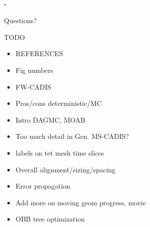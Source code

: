 \documentclass{beamer}
\begin{document}
\begin{frame}[c]
	\frametitle{\tiny{.}}
	\begin{center}
	{\Huge Questions?}
	\end{center}
\end{frame}

\begin{frame}{TODO}
	\begin{itemize}
		\item{REFERENCES}
		\item{Fig numbers}
		\item{FW-CADIS}
		\item{Pros/cons deterministic/MC}
		\item{Intro DAGMC, MOAB}
		\item{Too much detail in Gen. MS-CADIS?}
		\item{labels on tet mesh time slices}
		\item{Overall alignment/sizing/spacing}
		\item{Error propagation}
		\item{Add more on moving geom progress, movie}
		\item{OBB tree optimization}
	\end{itemize}
\end{frame}
\end{document}
